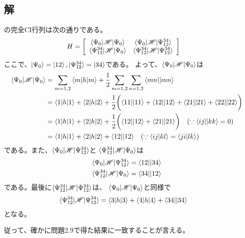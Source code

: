 \subsection{解}
の完全CI行列は次の通りである。
\begin{align}
	H
&=
	\left[
	\begin{array}{cc}
		\braket{\Psi_0|\mathscr{H}|\Psi_0} &
		\braket{\Psi_0|\mathscr{H}|\Psi_{12}^{34}} \\
		\braket{\Psi_{12}^{34}|\mathscr{H}|\Psi_0} &
		\braket{\Psi_{12}^{34}|\mathscr{H}|\Psi_{12}^{34}}
	\end{array}
	\right]
\end{align}
ここで、$\ket{\Psi_0}=\ket{12}, \ket{\Psi_{12}^{34}}=\ket{34}$である。
よって、$\braket{\Psi_0|\mathscr{H}|\Psi_0}$は
\begin{align}
	\braket{\Psi_0|\mathscr{H}|\Psi_0}
&=
	\sum_{m=1,2} \braket{m|h|m}
	+
	\frac{1}{2}
	\sum_{m=1,2} \sum_{n=1,2} \antitwo{mn}{mn} \\
%
%
&=
	\braket{1|h|1}
	+
	\braket{2|h|2}
	+
	\frac{1}{2}
	\biggl(
		\antitwo{11}{11}
		+
		\antitwo{12}{12}
		+
		\antitwo{21}{21}
		+
		\antitwo{22}{22}
	\biggr) \\
%
%
&=
	\braket{1|h|1}
	+
	\braket{2|h|2}
	+
	\frac{1}{2}
	\biggl(
		\antitwo{12}{12}
		+
		\antitwo{21}{21}
	\biggr)
	\quad
	(\because \antitwo{ij}{kk}=0) \\
%
%
&=
	\braket{1|h|1}
	+
	\braket{2|h|2}
	+
	\antitwo{12}{12}
	\quad
	(\because \phystwo{ij}{kl}=\phystwo{ji}{lk})
\end{align}
である。また、$\braket{\Psi_0|\mathscr{H}|\Psi_{12}^{34}}$と
$\braket{\Psi_{12}^{34}|\mathscr{H}|\Psi_0}$は
\begin{align}
	\braket{\Psi_0|\mathscr{H}|\Psi_{12}^{34}}
&=
	\antitwo{12}{34} \\
%
%
	\braket{\Psi_{12}^{34}|\mathscr{H}|\Psi_0}
&=
	\antitwo{34}{12}
\end{align}
である。最後に$\braket{\Psi_{12}^{34}|\mathscr{H}|\Psi_{12}^{34}}$は、
$\braket{\Psi_0|\mathscr{H}|\Psi_0}$と同様で
\begin{align}
	\braket{\Psi_{12}^{34}|\mathscr{H}|\Psi_{12}^{34}}
&=
	\braket{3|h|3}
	+
	\braket{4|h|4}
	+
	{\braket{34||34}}
\end{align}
となる。

従って、確かに問題2.9で得た結果に一致することが言える。
